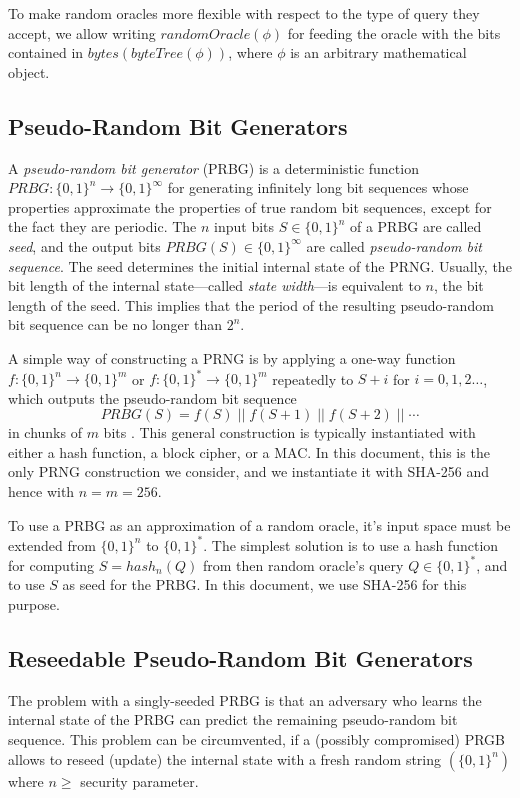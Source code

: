 \documentclass[bibtotoc,halfparskip,oneside]{scrreprt}
\newcommand{\conc}{\ensuremath{\;||\;}}
\begin{document}
	To make random oracles more flexible with respect to the type of query they accept, we allow writing $\mathit{randomOracle}(\phi)$ for feeding the oracle with the bits contained  in  $\mathit{bytes}(\mathit{byteTree}(\phi))$, where $\phi$ is an arbitrary mathematical object.
	
	\subsection{Pseudo-Random Bit Generators}
	
	A \emph{pseudo-random bit generator} (PRBG) is a deterministic function $\mathit{PRBG}:\{0,1\}^n\rightarrow\{0,1\}^\infty$ for generating infinitely long bit sequences whose properties approximate the properties of true random bit sequences, except for the fact they are periodic. The $n$ input bits $S\in \{0,1\}^n$ of a PRBG are called \emph{seed}, and the output bits $\mathit{PRBG}(S)\in\{0,1\}^\infty$ are called \emph{pseudo-random bit sequence}. The seed determines the initial internal state of the PRNG. Usually, the bit length of the internal state---called \emph{state width}---is equivalent to $n$, the bit length of the seed. This implies that the period of the resulting pseudo-random bit sequence can be no longer than $2^n$. 
	
	A simple way of constructing a PRNG is by applying a one-way function $f:\{0,1\}^n\rightarrow\{0,1\}^m$ or $f:\{0,1\}^*\rightarrow\{0,1\}^m$ repeatedly to $S+i$ for $i=0,1,2\ldots$, which outputs the pseudo-random bit sequence 
	$$\mathit{PRBG}(S)=f(S)\conc f(S+1)\conc f(S+2)\conc \cdots$$
	in chunks of $m$ bits \cite{MOV96}. This general construction is typically instantiated with either a hash function, a block cipher, or a MAC. In this document, this is the only PRNG construction we consider, and we instantiate it with SHA-256 and hence with $n=m=256$. 
	
	To use a PRBG as an approximation of a random oracle, it's input space must be extended from $\{0,1\}^n$ to $\{0,1\}^*$. The simplest solution is to use a hash function for computing  $S=\mathit{hash}_n(Q)$ from then random oracle's query $Q\in\{0,1\}^*$, and to use $S$ as seed for the PRBG. In this document, we use SHA-256 for this purpose.
	
	\subsection{Reseedable Pseudo-Random Bit Generators}
	
	The problem with a singly-seeded PRBG is that an adversary who learns the internal state of the PRBG can predict the remaining pseudo-random bit sequence. This problem can be circumvented, if a (possibly compromised) PRGB allows to reseed (update) the internal state with a fresh random string $(\{0,1\}^n)$ where $n\geq$ security parameter. 
	
\end{document}

